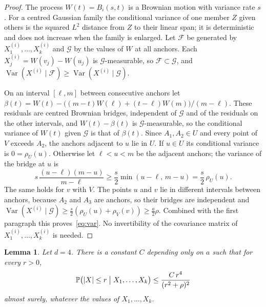 \documentclass[11pt]{amsart}
\newtheorem{lemma}[theorem]{Lemma}
\theoremstyle{remark}
\newcommand{\PP}{\mathbb{P}}
\newcommand{\Var}{\operatorname{Var}}
\begin{document}
\begin{proof}
The process $W(t)=B_i(s,t)$ is a Brownian motion with variance rate $s$. For a centred Gaussian family the conditional
variance of one member $Z$ given others is the squared $L^2$ distance from $Z$ to their linear span; it is
deterministic and does not increase when the family is enlarged. Let $\mathcal F$ be generated by $X^{(i)}_1,\dots,X^{(i)}_k$ and $\mathcal G$
by the values of $W$ at all anchors. Each $X^{(i)}_j=W(v_j)-W(u_j)$ is $\mathcal G$-measurable, so $\mathcal F\subset\mathcal
G$, and $\Var(X^{(i)}\mid\mathcal F)\ge\Var(X^{(i)}\mid\mathcal G)$.

On an interval $[\ell,m]$ between consecutive anchors let $\beta(t)=W(t)-\bigl((m-t)W(\ell)+(t-\ell)W(m)\bigr)/(m-\ell)$.
These residuals are centred Brownian bridges, independent of $\mathcal G$ and of the residuals on the other intervals,
and $W(t)-\beta(t)$ is $\mathcal G$-measurable, so the conditional variance of $W(t)$ given $\mathcal G$ is that of
$\beta(t)$. Since $A_1,A_2\in U$ and every point of $V$ exceeds $A_2$, the
anchors adjacent to $u$ lie in $U$. If $u\in U$ its conditional variance is $0=\rho_U(u)$. Otherwise let $\ell<u<m$ be
the adjacent anchors; the variance of the bridge at $u$ is
\[
s\,\frac{(u-\ell)(m-u)}{m-\ell}\ge\frac s2\min(u-\ell,\,m-u)=\frac s2\,\rho_U(u).
\]
The same holds for $v$ with $V$. The points $u$ and $v$ lie in different intervals between anchors, because $A_2$ and
$A_3$ are anchors, so their bridges are independent and
$\Var(X^{(i)}\mid\mathcal G)\ge\frac s2(\rho_U(u)+\rho_V(v))\ge\frac a2\rho$. Combined with the first paragraph this
proves~\eqref{eq:var}. No invertibility of the covariance matrix of $X^{(i)}_1,\dots,X^{(i)}_k$ is needed.
\end{proof}

\begin{lemma}\label{lem:smallball}
Let $d=4$. There is a constant $C$ depending only on $a$ such that for every $r>0$,
\begin{equation}\label{eq:smallball}
\PP\bigl(|X|\le r\bigm| X_1,\dots,X_k\bigr)\le\frac{C\,r^4}{(r^2+\rho)^2}
\end{equation}
almost surely, whatever the values of $X_1,\dots,X_k$.
\end{lemma}
\end{document}
